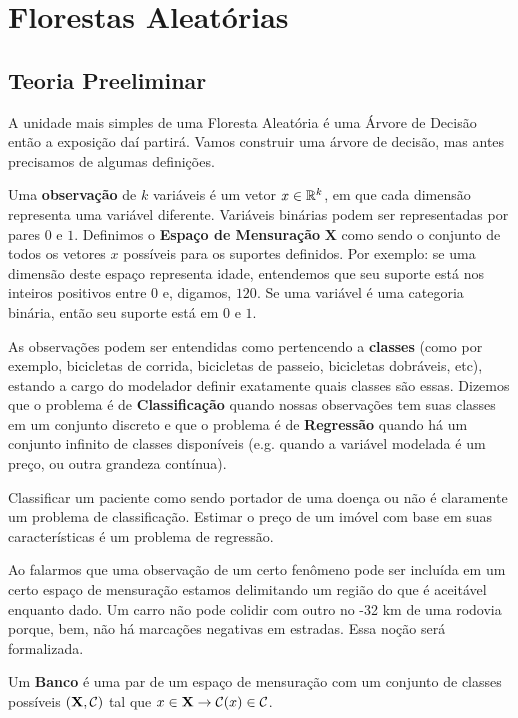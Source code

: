 
\chapter{Florestas Aleatórias}

\section{Teoria Preeliminar}

A unidade mais simples de uma Floresta Aleatória é uma Árvore de Decisão \cite{breiman2017classification} então a exposição daí partirá. Vamos construir uma árvore de decisão, mas antes precisamos de algumas definições. 

Uma \textbf{observação} de $k$ variáveis é um vetor $x \in \mathbb{R}^k$, em que cada dimensão representa uma variável diferente. Variáveis binárias podem ser representadas por pares $0$ e $1$. Definimos o \textbf{Espaço de Mensuração} $\mathbf{X}$ como sendo o conjunto de todos os vetores $x$ possíveis para os suportes definidos. Por exemplo: se uma dimensão deste espaço representa idade, entendemos que seu suporte está nos inteiros positivos entre $0$ e, digamos, $120$. Se uma variável é uma categoria binária, então seu suporte está em $0$ e $1$. 

As observações podem ser entendidas como pertencendo a \textbf{classes} (como por exemplo, bicicletas de corrida, bicicletas de passeio, bicicletas dobráveis, etc), estando a cargo do modelador definir exatamente quais classes são essas. Dizemos que o problema é de \textbf{Classificação} quando nossas observações tem suas classes em um conjunto discreto e que o problema é de \textbf{Regressão} quando há um conjunto infinito de classes disponíveis (e.g. quando a variável modelada é um preço, ou outra grandeza contínua).

Classificar um paciente como sendo portador de uma doença ou não é claramente um problema de classificação. Estimar o preço de um imóvel com base em suas características é um problema de regressão. 

Ao falarmos que uma observação de um certo fenômeno pode ser incluída em um certo espaço de mensuração estamos delimitando um região do que é aceitável enquanto dado. Um carro não pode colidir com outro no -32 km de uma rodovia porque, bem, não há marcações negativas em estradas. Essa noção será formalizada.


\begin{defi}
Um \textbf{Banco} é uma par de um espaço de mensuração com um conjunto de classes possíveis $(\mathbf{X}, \mathcal{C})$ tal que $x \in \mathbf{X} \to \mathcal{C}(x) \in \mathcal{C}$. 
\end{defi}

